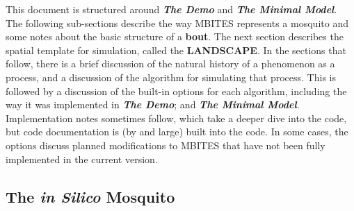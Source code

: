 \documentclass{article}
\newcommand{\demo}{{{\bf \em The Demo}}}
\newcommand{\minmod}{{{\bf \em The Minimal Model}}}
\begin{document}
This document is structured around \demo\; and \minmod. The following sub-sections describe the way MBITES represents a mosquito and some notes about the basic structure of a {\bf bout}. The next section describes the spatial template for simulation, called the {\bf LANDSCAPE}. In the sections that follow, there is a brief discussion of the natural history of a phenomenon as a process, and a discussion of the algorithm for simulating that process. This is followed by a discussion of the built-in options for each algorithm, including the way it was implemented in \demo; and \minmod. Implementation notes sometimes follow, which take a deeper dive into the code, but code documentation is (by and large) built into the code. In some cases, the options discuss planned modifications to MBITES that have not been fully implemented in the current version.  

\subsection{The {\em in Silico} Mosquito}
\end{document}
